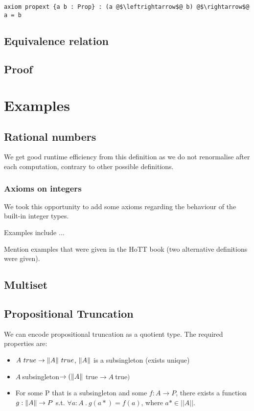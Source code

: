 \documentclass[11pt]{article}
\DeclarePairedDelimiter{\norm}{\lVert}{\rVert}
\begin{document}
\begin{verbatim}
axiom propext {a b : Prop} : (a @$\leftrightarrow$@ b) @$\rightarrow$@ a = b
\end{verbatim}


\subsection{Equivalence relation}

\subsection{Proof}

\section{Examples}
\subsection{Rational numbers}
We get good runtime efficiency from this definition as we do not renormalise after each computation, contrary to other possible definitions.

\subsubsection{Axioms on integers}

We took this opportunity to add some axioms regarding the behaviour of the built-in integer types. 

Examples include $\ldots$

Mention examples that were given in the HoTT book (two alternative definitions were given).

\subsection{Multiset}
\subsection{Propositional Truncation}

We can encode propositional truncation as a quotient type. The required properties are:

\begin{itemize}
	\item $A \ true \rightarrow \norm{A} \ true$, $\norm{A}$ is a subsingleton (exists unique)
	\item $A  \ $subsingleton$ \rightarrow (\norm{A} \ $true$ \rightarrow A \ $true$)$
	\item For some P that is a subsingleton and some $f :  A \rightarrow P$, there exists a function $g : \norm{A} \rightarrow P$ s.t. $ \forall a : A \ . \ g(a*) = f(a)$, where $ a* \in ||A||$.
\end{itemize}
\end{document}
